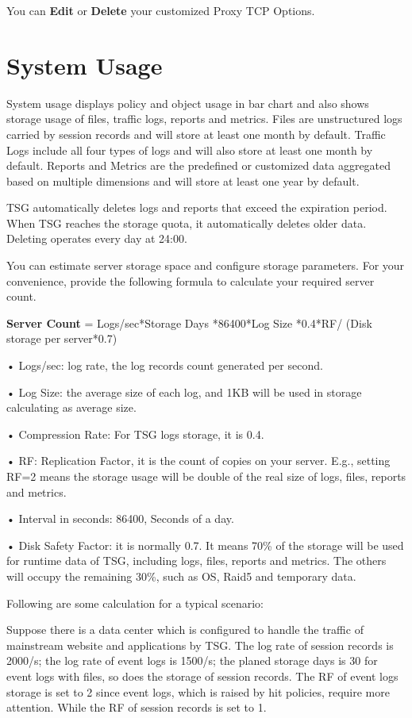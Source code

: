 You can \textbf{Edit} or \textbf{Delete} your customized Proxy TCP Options.

\section*{\hypertarget{link:System Usage}{System Usage}}
\label{sec:setting:usage}

System usage displays policy and object usage in bar chart and also shows storage usage of files, traffic logs, reports and metrics. Files are unstructured logs carried by session records and will store at least one month by default. Traffic Logs include all four types of logs and will also store at least one month by default. Reports and Metrics are the predefined or customized data aggregated based on multiple dimensions and will store at least one year by default. 


TSG automatically deletes logs and reports that exceed the expiration period. When TSG reaches the storage quota, it automatically deletes older data. Deleting operates every day at 24:00. 


You can estimate server storage space and configure storage parameters. For your convenience, provide the following formula to calculate your required server count. 


\textbf{Server Count} = Logs/sec*Storage Days *86400*Log Size *0.4*RF/ (Disk storage per server*0.7)


• Logs/sec: log rate, the log records count generated per second.


• Log Size: the average size of each log, and 1KB will be used in storage calculating as average size.


• Compression Rate: For TSG logs storage, it is 0.4. 


• RF: Replication Factor, it is the count of copies on your server. E.g., setting RF=2 means the storage usage will be double of the real size of logs, files, reports and metrics.


• Interval in seconds: 86400, Seconds of a day.


• Disk Safety Factor: it is normally 0.7. It means 70\% of the storage will be used for runtime data of TSG, including logs, files, reports and metrics. The others will occupy the remaining 30\%, such as OS, Raid5 and temporary data. 


Following are some calculation for a typical scenario:


Suppose there is a data center which is configured to handle the traffic of mainstream website and applications by TSG. The log rate of session records is 2000/s; the log rate of event logs is 1500/s; the planed storage days is 30 for event logs with files, so does the storage of session records. The RF of event logs storage is set to 2 since event logs, which is raised by hit policies, require more attention. While the RF of session records is set to 1.


